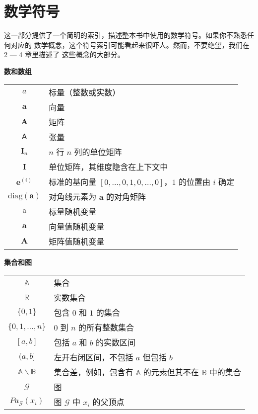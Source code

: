 \chapter{数学符号}
\label{ch:notation}

这一部分提供了一个简明的索引，描述整本书中使用的数学符号。如果你不熟悉任何对应的
数学概念，这个符号索引可能看起来很吓人。然而，不要绝望，我们在 2 --- 4 章里描述了
这些概念的大部分。

\begin{center}
  {\Large\bfseries 数和数组}\\
  \vspace{1em}
  \begin{tabular}{c l}
    $a$ & 标量（整数或实数）\\
    $\pmb{a}$ & 向量 \\
    $\pmb{A}$ & 矩阵 \\
    $\pmb{\mathsf{A}}$ & 张量 \\
    $\pmb{I}_n$ & $n$ 行 $n$ 列的单位矩阵 \\
    $\pmb{I}$ & 单位矩阵，其维度隐含在上下文中 \\
    $\pmb{e}^{(i)}$ & 标准的基向量 $[0, \ldots, 0, 1, 0, \ldots, 0]$，$1$ 的位置由 $i$ 确定 \\
    $\mathrm{diag}(\pmb{a})$ & 对角线元素为 $\pmb{a}$ 的对角矩阵 \\
    $\mathrm{a}$ & 标量随机变量 \\
    $\mathbf{a}$ & 向量值随机变量 \\
    $\mathbf{A}$ & 矩阵值随机变量
  \end{tabular}
\end{center}

\vspace{1em}

\begin{center}
  {\Large\bfseries 集合和图}\\
  \vspace{1em}
  \begin{tabular}{c l}
    $\mathbb{A}$ & 集合 \\
    $\mathbb{R}$ & 实数集合 \\
    $\{0,1\}$ & 包含 $0$ 和 $1$ 的集合 \\
    $\{0,1,\ldots,n\}$ & $0$ 到 $n$ 的所有整数集合 \\
    $[a,b]$ & 包括 $a$ 和 $b$ 的实数区间 \\
    $(a,b]$ & 左开右闭区间，不包括 $a$ 但包括 $b$ \\
    $\mathbb{A}\backslash\mathbb{B}$ & 集合差，例如，包含有 $\mathbb{A}$ 的元素但其不在 $\mathbb{B}$ 中的集合 \\
    $\mathcal{G}$ & 图 \\
    $Pa_{\mathcal{G}}(x_i)$ & 图  $\mathcal{G}$ 中 $x_i$ 的父顶点
  \end{tabular}
\end{center}

